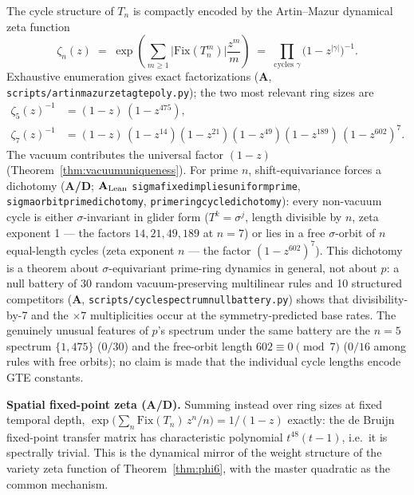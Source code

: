 \documentclass[11pt]{article}
\theoremstyle{remark}
\newcommand{\lean}[1]{%
  \penalty-100
  \begingroup\def\_{\textunderscore\allowbreak}\texttt{#1}\endgroup}
\newcommand{\CatA}{\textbf{A}}
\newcommand{\CatAL}{\texorpdfstring{\ensuremath{\textbf{A}_{\rm Lean}}}{A-Lean}}
\newcommand{\CatAD}{\textbf{A/D}}
\begin{document}
The cycle structure of $T_n$ is compactly encoded by the Artin--Mazur
dynamical zeta function~\cite{ArtinMazur1965}
\[
  \zeta_n(z) \;=\; \exp\!\left(\sum_{m \geq 1}
  \bigl|\mathrm{Fix}(T_n^m)\bigr| \frac{z^m}{m}\right)
  \;=\; \prod_{\text{cycles } \gamma} \bigl(1 - z^{|\gamma|}\bigr)^{-1}.
\]
Exhaustive enumeration gives exact factorizations (\CatA{},
\lean{scripts/artin\_mazur\_zeta\_gte\_poly.py}); the two most relevant
ring sizes are
\begin{align*}
  \zeta_5(z)^{-1} &= (1-z)\,(1-z^{475}), \\
  \zeta_7(z)^{-1} &= (1-z)\,(1-z^{14})(1-z^{21})(1-z^{49})(1-z^{189})\,
                     (1-z^{602})^{7}.
\end{align*}
The vacuum contributes the universal factor $(1-z)$
(Theorem~\ref{thm:vacuumuniqueness}). For prime $n$, shift-equivariance
forces a dichotomy (\CatAD{}; \CatAL{}
\lean{sigma\_fixed\_implies\_uniform\_prime},
\lean{sigma\_orbit\_prime\_dichotomy},
\lean{prime\_ring\_cycle\_dichotomy}): every non-vacuum cycle is
either $\sigma$-invariant in glider form ($T^k = \sigma^j$, length
divisible by $n$, zeta exponent 1 --- the factors $14, 21, 49, 189$ at
$n = 7$) or lies in a free $\sigma$-orbit of $n$ equal-length cycles (zeta
exponent $n$ --- the factor $(1-z^{602})^7$). This dichotomy is a theorem
about $\sigma$-equivariant prime-ring dynamics in general, not about $p$:
a null battery of 30 random vacuum-preserving multilinear rules and 10
structured competitors
(\CatA{}, \lean{scripts/cycle\_spectrum\_null\_battery.py}) shows that
divisibility-by-7 and the $\times 7$ multiplicities occur at the
symmetry-predicted base rates. The genuinely unusual features of $p$'s
spectrum under the same battery are the $n = 5$ spectrum $\{1, 475\}$
($0/30$) and the free-orbit length $602 \equiv 0 \pmod 7$ ($0/16$ among
rules with free orbits); no claim is made that the individual cycle
lengths encode GTE constants.

\medskip
\noindent\textbf{Spatial fixed-point zeta (\CatAD{}).} Summing instead
over ring sizes at fixed temporal depth,
$\exp\bigl(\sum_n \mathrm{Fix}(T_n)\, z^n/n\bigr) = 1/(1-z)$ exactly: the
de Bruijn fixed-point transfer matrix has characteristic polynomial
$t^{48}(t-1)$, i.e.\ it is spectrally trivial. This is the dynamical
mirror of the weight structure of the variety zeta function of
Theorem~\ref{thm:phi6}, with the master quadratic as the common mechanism.
\end{document}
